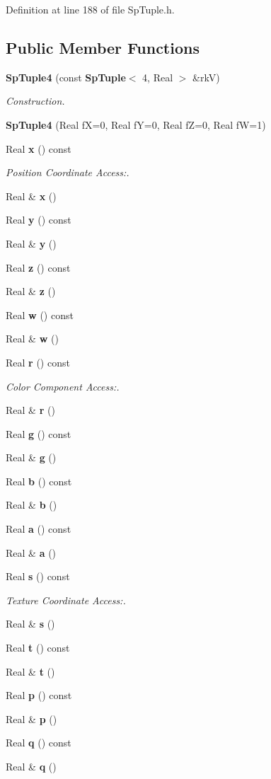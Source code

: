 Definition at line 188 of file Sp\-Tuple.h.\subsection*{Public Member Functions}
\begin{CompactItemize}
\item 
{\bf Sp\-Tuple4} (const {\bf Sp\-Tuple}$<$ 4, Real $>$ \&rk\-V)
\begin{CompactList}\small\item\em Construction. \item\end{CompactList}\item 
{\bf Sp\-Tuple4} (Real f\-X=0, Real f\-Y=0, Real f\-Z=0, Real f\-W=1)
\item 
Real {\bf x} () const
\begin{CompactList}\small\item\em Position Coordinate Access:. \item\end{CompactList}\item 
Real \& {\bf x} ()
\item 
Real {\bf y} () const
\item 
Real \& {\bf y} ()
\item 
Real {\bf z} () const
\item 
Real \& {\bf z} ()
\item 
Real {\bf w} () const
\item 
Real \& {\bf w} ()
\item 
Real {\bf r} () const
\begin{CompactList}\small\item\em Color Component Access:. \item\end{CompactList}\item 
Real \& {\bf r} ()
\item 
Real {\bf g} () const
\item 
Real \& {\bf g} ()
\item 
Real {\bf b} () const
\item 
Real \& {\bf b} ()
\item 
Real {\bf a} () const
\item 
Real \& {\bf a} ()
\item 
Real {\bf s} () const
\begin{CompactList}\small\item\em Texture Coordinate Access:. \item\end{CompactList}\item 
Real \& {\bf s} ()
\item 
Real {\bf t} () const
\item 
Real \& {\bf t} ()
\item 
Real {\bf p} () const
\item 
Real \& {\bf p} ()
\item 
Real {\bf q} () const
\item 
Real \& {\bf q} ()
\end{CompactItemize}


